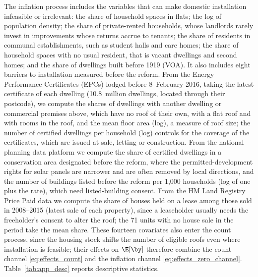 The inflation process includes the variables that can make domestic installation infeasible or irrelevant:
the share of household spaces in flats;
the log of population density;
the share of private-rented households, whose landlords rarely invest in improvements whose returns accrue to tenants;
the share of residents in communal establishments, such as student halls and care homes;
the share of household spaces with no usual resident, that is vacant dwellings and second homes;
and the share of dwellings built before 1919 (VOA).
It also includes eight barriers to installation measured before the reform.
From the Energy Performance Certificates (EPCs) lodged before 8~February 2016, taking the latest certificate of each dwelling (10.8~million dwellings, located through their postcode), we compute the shares of dwellings with another dwelling or commercial premises above, which have no roof of their own, with a flat roof and with rooms in the roof, and the mean floor area (log), a measure of roof size; the number of certified dwellings per household (log) controls for the coverage of the certificates, which are issued at sale, letting or construction.
From the national planning data platform we compute the share of certified dwellings in a conservation area designated before the reform, where the permitted-development rights for solar panels are narrower and are often removed by local directions, and the number of buildings listed before the reform per 1{,}000 households (log of one plus the rate), which need listed-building consent.
From the HM Land Registry Price Paid data we compute the share of houses held on a lease among those sold in 2008--2015 (latest sale of each property), since a leaseholder usually needs the freeholder's consent to alter the roof; the 71 units with no house sale in the period take the mean share.
These fourteen covariates also enter the count process, since the housing stock shifts the number of eligible roofs even where installation is feasible; their effects on $\E[\by]$ therefore combine the count channel \eqref{eq:effects_count} and the inflation channel \eqref{eq:effects_zero_channel}.
Table~\ref{tab:app_desc} reports descriptive statistics.


